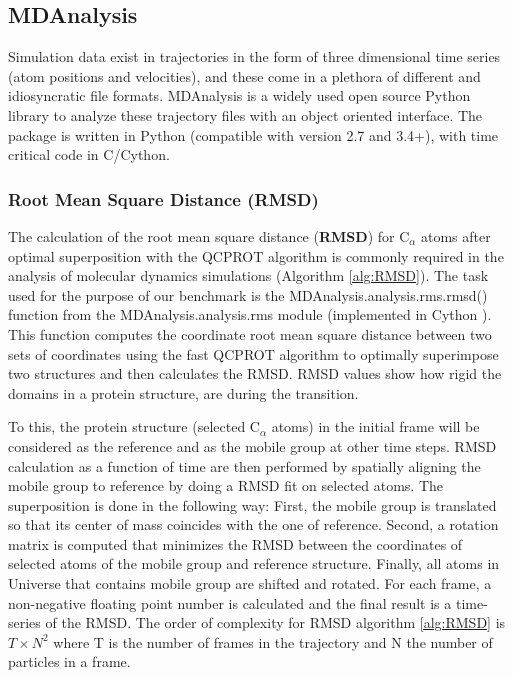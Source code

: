 \label{use_cases}

\subsection{MDAnalysis}
Simulation data exist in trajectories in the form of three dimensional time series (atom positions and velocities), and these come in a plethora of different and idiosyncratic file formats. 
MDAnalysis is a widely used open source Python library to analyze these trajectory files with an object oriented interface. 
The package is written in Python (compatible with version 2.7 and 3.4+), with time critical code in C/Cython. 
\label{sec:mda}

\subsubsection{Root Mean Square Distance (RMSD)}
The calculation of the root mean square distance (\textbf{RMSD}) for C$_{\alpha}$ atoms after
optimal superposition with the QCPROT algorithm \citep{Liu:2010kx,Theobald:2005vn} is commonly required in the analysis of molecular dynamics simulations (Algorithm \ref{alg:RMSD}). 
The task used for the purpose of our benchmark is the MDAnalysis.analysis.rms.rmsd() function from the MDAnalysis.analysis.rms module (implemented in Cython \citep{Gowers:2016aa}).  
This function computes the coordinate root mean square distance between two sets of coordinates using the fast QCPROT algorithm to optimally superimpose two structures and then calculates the RMSD. 
RMSD values show how rigid the domains in a protein structure, are during the transition. 

To this, the protein structure (selected C$_{\alpha}$ atoms) in the initial frame will be considered as the reference and as the mobile group at other time steps. 
RMSD calculation as a function of time are then performed by spatially aligning the mobile group to reference by doing a RMSD fit on selected atoms.
The superposition is done in the following way:
First, the mobile group is translated so that its center of mass coincides with the one of reference. 
Second, a rotation matrix is computed that minimizes the RMSD between the coordinates of selected atoms of the mobile group and reference structure. 
Finally, all atoms in Universe that contains mobile group are shifted and rotated.
For each frame, a non-negative floating point number is calculated and the final result is a time-series of the RMSD. 
The order of complexity for RMSD algorithm \ref{alg:RMSD} is $T \times N^{2}$ where T is the number of frames in the trajectory and N the number of particles in a frame.

